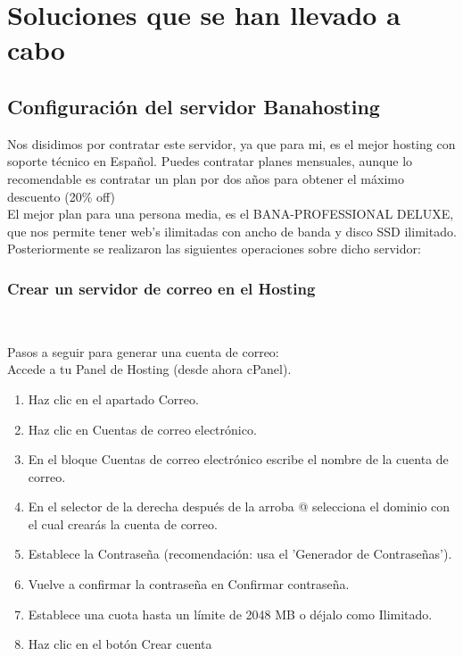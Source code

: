 		\section{Soluciones que se han llevado a cabo}
		
		\subsection{Configuración del servidor Banahosting}
		
		Nos disidimos por contratar este servidor, ya que para mi, es el mejor hosting con soporte técnico en Español. Puedes contratar planes mensuales, aunque lo recomendable es contratar un plan por dos años para obtener el máximo descuento (20\% off) \\
		
		El mejor plan para una persona media, es el BANA-PROFESSIONAL DELUXE, que nos permite tener web's ilimitadas con ancho de banda y disco SSD ilimitado. \\
		
		Posteriormente se realizaron las siguientes operaciones sobre dicho servidor:
		
		\subsubsection{Crear un servidor de correo en el Hosting}\
		
		Pasos a seguir para generar una cuenta de correo:\\
		
		Accede a tu Panel de Hosting (desde ahora cPanel).\\
		
		\begin{enumerate}
			\item Haz clic en el apartado Correo.
			\item Haz clic en Cuentas de correo electrónico.
			\item En el bloque Cuentas de correo electrónico escribe el nombre de la cuenta de correo.
			\item En el selector de la derecha después de la arroba @ selecciona el dominio con el cual crearás la cuenta de correo.
			\item Establece la Contraseña (recomendación: usa el 'Generador de Contraseñas').
			\item Vuelve a confirmar la contraseña en Confirmar contraseña.
			\item Establece una cuota hasta un límite de 2048 MB o déjalo como Ilimitado.
			\item Haz clic en el botón Crear cuenta
		\end{enumerate}
		
